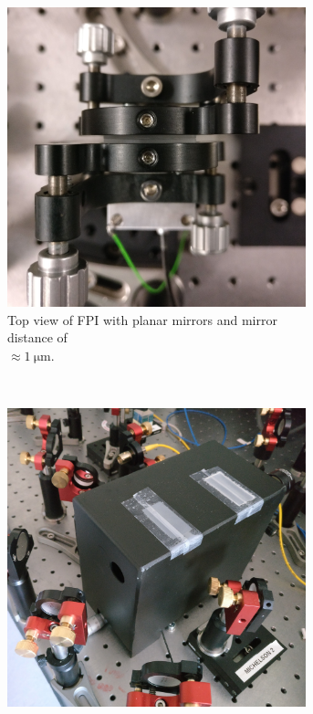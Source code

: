 \begin{figure}[H]
	\centering
	\begin{subfigure}[b]{0.48\textwidth}
		\centering
		\includegraphics[width=0.95\textwidth]{figures/fabry-perot/setup/topview}
		\caption{Top view of FPI with planar mirrors and mirror distance of \\$\approx\SI{1}{\micro \meter}$.}
		\label{fig:topview}
	\end{subfigure}%
	~ %
	\begin{subfigure}[b]{0.48\textwidth}
		\centering
		\includegraphics[width=0.95\textwidth]{figures/fabry-perot/setup/casing}

\end{subfigure}
\end{figure}
